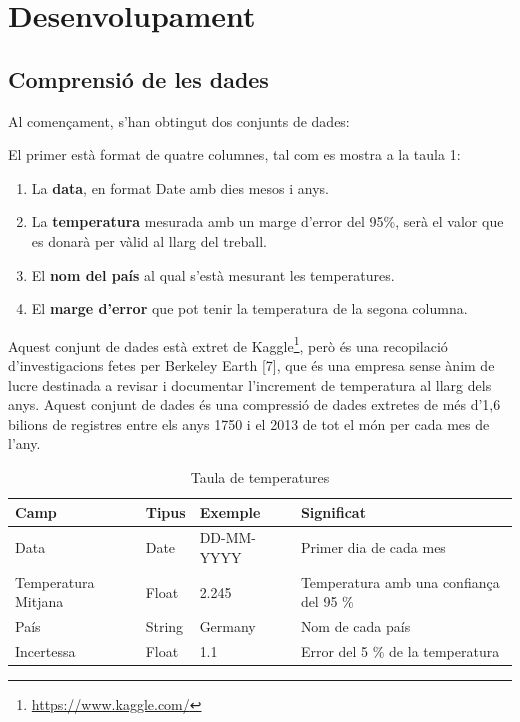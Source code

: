 \documentclass[10pt,a4paper,twocolumn,twoside]{article}
\begin{document}
\section {Desenvolupament}
\subsection{Comprensió de les dades}
Al començament, s'han obtingut dos conjunts de dades:

El primer està format de quatre columnes, tal com es mostra a la taula 1:
\begin{enumerate}
\item La \textbf{data}, en format Date amb dies mesos i anys.
\item La \textbf{temperatura} mesurada amb un marge d'error del 95\%, serà el valor que es donarà per vàlid al llarg del treball. 
\item El \textbf{nom del país} al qual s'està mesurant les temperatures.
\item El \textbf{marge d'error} que pot tenir la temperatura de la segona columna.
\end{enumerate}
Aquest conjunt de dades està extret de Kaggle\footnote{\url{https://www.kaggle.com/}}, però és una recopilació d'investigacions fetes per Berkeley Earth [7], que és una empresa sense ànim de lucre destinada a revisar i documentar l'increment de temperatura al llarg dels anys. Aquest conjunt de dades és una compressió de dades extretes de més d'1,6 bilions de registres entre els anys 1750 i el 2013 de tot el món per cada mes de l'any.

\begin{table}[th]
\caption{Taula de temperatures}
\begin{center}
\begin{tabular}{  m{1.6cm}| m{0.8cm}| m{1.3cm} | m{2.5cm} }
\hline\hline %
\textbf{Camp} & \textbf{Tipus} & \textbf{Exemple} & \textbf{Significat} \\
\hline
Data & Date & DD-MM-YYYY & Primer dia de cada mes \\
\hline
Temperatura Mitjana & Float & 2.245 & Temperatura amb una confiança del 95 \%  \\
\hline
País & String & Germany & Nom de cada país \\
\hline
Incertessa & Float & 1.1 & Error del 5 \% de la temperatura\\
\hline
\hline
\end{tabular}
\end{center}
\end{table}
\end{document}
